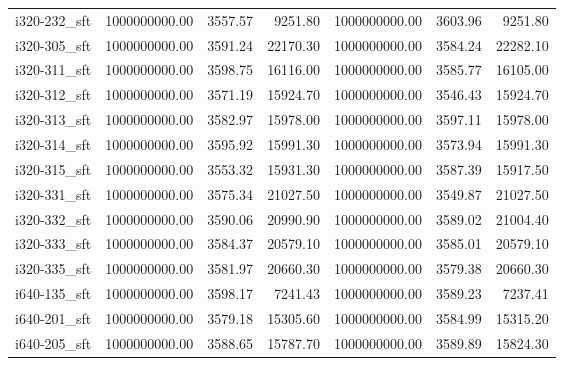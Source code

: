 \begin{tabular}{lrrrrrr}
i320-232\_sft &      1000000000.00 &                3557.57 &          9251.80 &         1000000000.00 &                   3603.96 &             9251.80 \\
i320-305\_sft &      1000000000.00 &                3591.24 &         22170.30 &         1000000000.00 &                   3584.24 &            22282.10 \\
i320-311\_sft &      1000000000.00 &                3598.75 &         16116.00 &         1000000000.00 &                   3585.77 &            16105.00 \\
i320-312\_sft &      1000000000.00 &                3571.19 &         15924.70 &         1000000000.00 &                   3546.43 &            15924.70 \\
i320-313\_sft &      1000000000.00 &                3582.97 &         15978.00 &         1000000000.00 &                   3597.11 &            15978.00 \\
i320-314\_sft &      1000000000.00 &                3595.92 &         15991.30 &         1000000000.00 &                   3573.94 &            15991.30 \\
i320-315\_sft &      1000000000.00 &                3553.32 &         15931.30 &         1000000000.00 &                   3587.39 &            15917.50 \\
i320-331\_sft &      1000000000.00 &                3575.34 &         21027.50 &         1000000000.00 &                   3549.87 &            21027.50 \\
i320-332\_sft &      1000000000.00 &                3590.06 &         20990.90 &         1000000000.00 &                   3589.02 &            21004.40 \\
i320-333\_sft &      1000000000.00 &                3584.37 &         20579.10 &         1000000000.00 &                   3585.01 &            20579.10 \\
i320-335\_sft &      1000000000.00 &                3581.97 &         20660.30 &         1000000000.00 &                   3579.38 &            20660.30 \\
i640-135\_sft &      1000000000.00 &                3598.17 &          7241.43 &         1000000000.00 &                   3589.23 &             7237.41 \\
i640-201\_sft &      1000000000.00 &                3579.18 &         15305.60 &         1000000000.00 &                   3584.99 &            15315.20 \\
i640-205\_sft &      1000000000.00 &                3588.65 &         15787.70 &         1000000000.00 &                   3589.89 &            15824.30 \\

\end{tabular}
